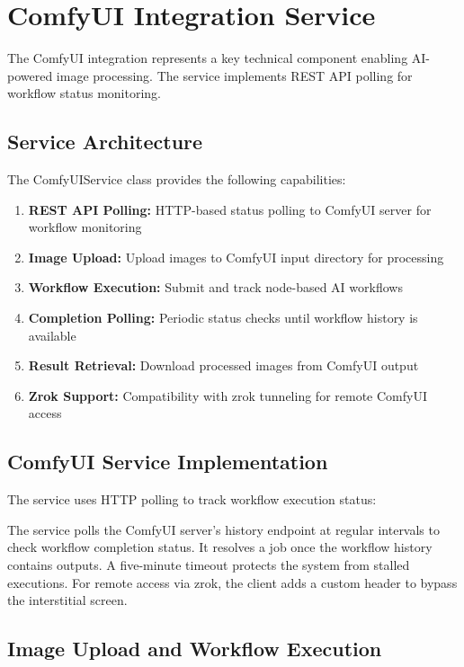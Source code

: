 \section{ComfyUI Integration Service}
\label{sec:comfyui}

The ComfyUI integration represents a key technical component enabling AI-powered image processing. The service implements REST API polling for workflow status monitoring.

\subsection{Service Architecture}

The ComfyUIService class provides the following capabilities:

\begin{enumerate}
    \item \textbf{REST API Polling:} HTTP-based status polling to ComfyUI server for workflow monitoring
    \item \textbf{Image Upload:} Upload images to ComfyUI input directory for processing
    \item \textbf{Workflow Execution:} Submit and track node-based AI workflows
    \item \textbf{Completion Polling:} Periodic status checks until workflow history is available
    \item \textbf{Result Retrieval:} Download processed images from ComfyUI output
    \item \textbf{Zrok Support:} Compatibility with zrok tunneling for remote ComfyUI access
\end{enumerate}

\subsection{ComfyUI Service Implementation}

The service uses HTTP polling to track workflow execution status:

The service polls the ComfyUI server's history endpoint at regular intervals to check workflow completion status. It resolves a job once the workflow history contains outputs. A five-minute timeout protects the system from stalled executions. For remote access via zrok, the client adds a custom header to bypass the interstitial screen.

\subsection{Image Upload and Workflow Execution}

